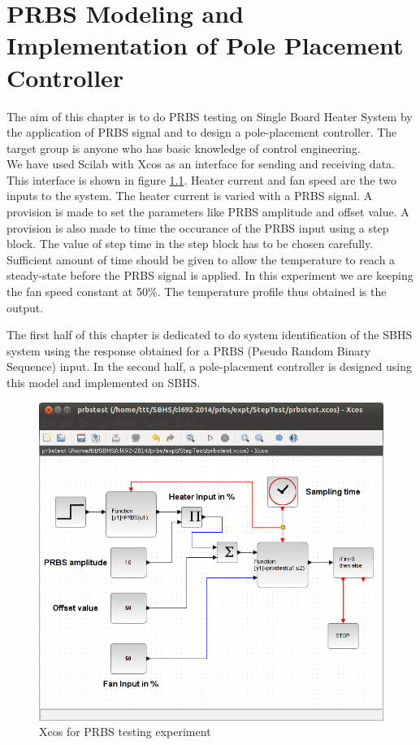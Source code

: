 \chapter{PRBS Modeling and Implementation of Pole Placement Controller}
The aim of this chapter is to do PRBS testing on Single Board Heater System by the application of PRBS signal 
and to design a pole-placement controller. The target group is anyone who has basic knowledge of control engineering. \\
We have used Scilab with Xcos as an interface for sending and receiving data. This interface is shown in figure \ref{prbs-xcos}.
Heater current and fan speed are the two inputs to the system. The heater current is varied with a PRBS signal. A provision
is made to set the parameters like PRBS amplitude and offset value. A provision is also made to time the occurance of the PRBS 
input using a step block. The value of step time in the step block has to be chosen carefully. Sufficient amount of time
should be given to allow the temperature to reach a steady-state before the PRBS signal is applied. In this experiment we are
keeping the fan speed constant at 50\%. The temperature profile thus obtained is the output.

The first half of this chapter is dedicated to do system identification of the SBHS system using the response obtained for a 
PRBS (Pseudo Random Binary Sequence) input. In the second half, a pole-placement controller is designed using this model and 
implemented on SBHS.
\begin{figure}
\centering
\includegraphics[width=0.7\linewidth]{prbs/prbs-xcos.png}
\caption{Xcos for PRBS testing experiment}
\label{prbs-xcos}
\end{figure}

